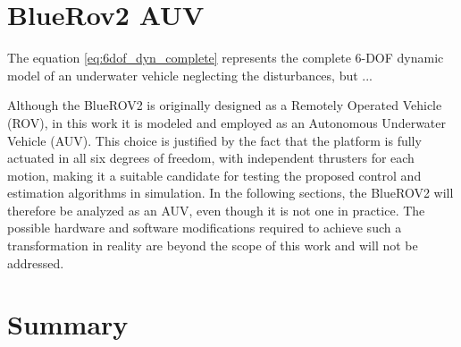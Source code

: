 \section{BlueRov2 AUV}
The equation \ref{eq:6dof_dyn_complete} represents the complete 6-DOF dynamic model of an underwater vehicle neglecting the disturbances, but ...

Although the BlueROV2 is originally designed as a Remotely Operated Vehicle (ROV), in this work it is modeled and employed as an Autonomous Underwater Vehicle (AUV). 
This choice is justified by the fact that the platform is fully actuated in all six degrees of freedom, with independent thrusters for each motion, making it a 
suitable candidate for testing the proposed control and estimation algorithms in simulation. In the following sections, the BlueROV2 will therefore be analyzed as 
an AUV, even though it is not one in practice. The possible hardware and software modifications required to achieve such a transformation in reality are beyond the 
scope of this work and will not be addressed.

\section{Summary}



